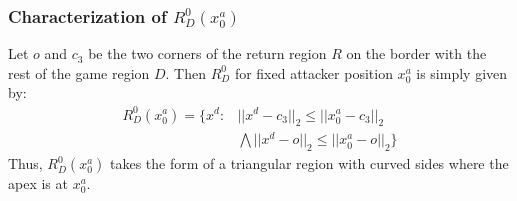 \documentclass[letterpaper, 10 pt, conference]{ieeeconf}  %
\numberwithin{algorithm}{section}
\begin{document}
%
%

\subsubsection{Characterization of $R_D^0(x^a_0)$}
\label{sec:RD0}
Let $o$ and $c_3$ be the two corners of the return region $R$ on the border with the rest of the game region $D$.  Then $R^0_D$ for fixed attacker position $x^a_0$ is simply given by:
\begin{align}
\label{eq:RD0}
R^0_D(x^a_0)= \{x^d : &||x^d - c_3||_2 \leq ||x^a_0 - c_3||_2 \nonumber\\ &\bigwedge 
 ||x^d - o||_2 \leq ||x^a_0 - o||_2 \}
\end{align}
Thus, $R^0_D(x^a_0)$ takes the form of a triangular region with curved sides where the apex is at $x^a_0$.
\end{document}
